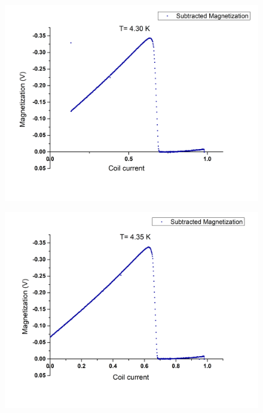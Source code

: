 \documentclass[openany,11pt,a4paper]{report}
\begin{document}
\begin{figure}[H]
\begin{center}
\includegraphics[scale=0.5]{430.jpg}
\end{center}
\end{figure}



\begin{figure}[H]
\begin{center}
\includegraphics[scale=0.5]{435.jpg}
\end{center}
\end{figure}
\end{document}
